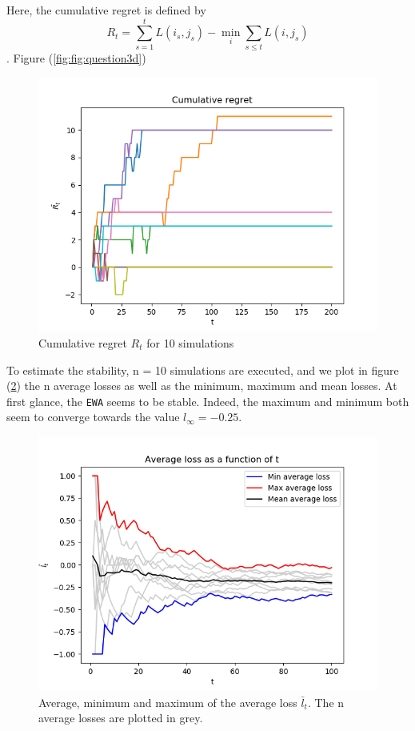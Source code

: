  Here, the cumulative regret is defined by 
\begin{equation}
	R_t = \sum_{s = 1}^t L(i_s, j_s) - \underset{i}{\min} \sum_{s \leqslant t}L(i, j_s)
\end{equation}. Figure (\ref{fig:fig:question3d})

\begin{figure}
	\includegraphics[width=\textwidth]{images/question3d}
	\caption{Cumulative regret $R_t$ for 10 simulations}
	\label{fig:question3d}
\end{figure}

 To estimate the stability, n = 10 simulations are executed, and we plot in figure (\ref{fig:question3e}) the n average losses as well as the minimum, maximum and mean losses. At first glance, the \texttt{EWA} seems to be stable. Indeed, the maximum and minimum both seem to converge towards the value $l_\infty = -0.25$.

\begin{figure}
	\includegraphics[width=\textwidth]{images/question3e}
	\caption{Average, minimum and maximum of the average loss $\bar{l}_t$. The n average losses are plotted in grey.}
	\label{fig:question3e}
\end{figure}

